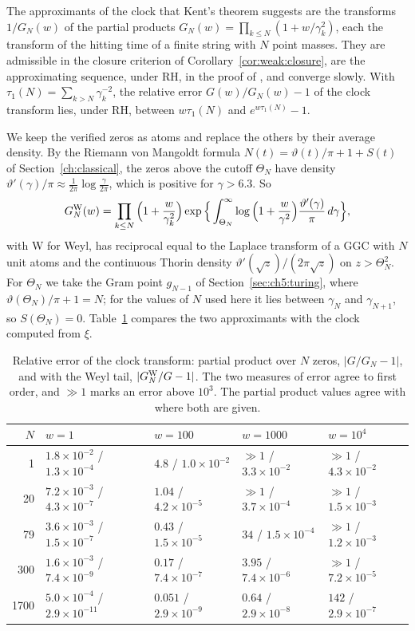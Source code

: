 The approximants of the clock that Kent's theorem suggests are the transforms $1/G_N(w)$ of the partial products $G_N(w)=\prod_{k\le N}(1+w/\gamma_k^2)$, each the transform of the hitting time of a finite string with $N$ point masses. They are admissible in the closure criterion of Corollary~\ref{cor:weak:closure}, are the approximating sequence, under RH, in the proof of \cite[Proposition 18.10]{P26}, and converge slowly. With $\tau_1(N)=\sum_{k>N}\gamma_k^{-2}$, the relative error $G(w)/G_N(w)-1$ of the clock transform lies, under RH, between $w\tau_1(N)$ and $e^{w\tau_1(N)}-1$.

We keep the verified zeros as atoms and replace the others by their average density. By the Riemann von Mangoldt formula $N(t)=\vartheta(t)/\pi+1+S(t)$ of Section~\ref{ch:classical}, the zeros above the cutoff $\Theta_N$ have density $\vartheta'(\gamma)/\pi\approx\frac1{2\pi}\log\frac\gamma{2\pi}$, which is positive for $\gamma>6.3$. So
\[
G_N^{\rm W}(w)=\prod_{k\le N}\Big(1+\frac w{\gamma_k^2}\Big)\exp\Big\{\int_{\Theta_N}^\infty\log\Big(1+\frac w{\gamma^2}\Big)\frac{\vartheta'(\gamma)}\pi\,d\gamma\Big\},
\]
with W for Weyl, has reciprocal equal to the Laplace transform of a GGC with $N$ unit atoms and the continuous Thorin density $\vartheta'(\sqrt z)/(2\pi\sqrt z)$ on $z>\Theta_N^2$. For $\Theta_N$ we take the Gram point $g_{N-1}$ of Section~\ref{sec:ch5:turing}, where $\vartheta(\Theta_N)/\pi+1=N$; for the values of $N$ used here it lies between $\gamma_N$ and $\gamma_{N+1}$, so $S(\Theta_N)=0$. Table~\ref{tab:ch18:kent} compares the two approximants with the clock computed from $\xi$.

\begin{table}[htbp]
\centering\footnotesize
\setlength{\tabcolsep}{4pt}
\begin{tabular}{rllll}
\toprule
$N$ & $w=1$ & $w=100$ & $w=1000$ & $w=10^4$\\
\midrule
1 & $1.8\times10^{-2}$ / $1.3\times10^{-4}$ & $4.8$ / $1.0\times10^{-2}$ & $\gg1$ / $3.3\times10^{-2}$ & $\gg1$ / $4.3\times10^{-2}$\\
20 & $7.2\times10^{-3}$ / $4.3\times10^{-7}$ & $1.04$ / $4.2\times10^{-5}$ & $\gg1$ / $3.7\times10^{-4}$ & $\gg1$ / $1.5\times10^{-3}$\\
79 & $3.6\times10^{-3}$ / $1.5\times10^{-7}$ & $0.43$ / $1.5\times10^{-5}$ & $34$ / $1.5\times10^{-4}$ & $\gg1$ / $1.2\times10^{-3}$\\
300 & $1.6\times10^{-3}$ / $7.4\times10^{-9}$ & $0.17$ / $7.4\times10^{-7}$ & $3.95$ / $7.4\times10^{-6}$ & $\gg1$ / $7.2\times10^{-5}$\\
1700 & $5.0\times10^{-4}$ / $2.9\times10^{-11}$ & $0.051$ / $2.9\times10^{-9}$ & $0.64$ / $2.9\times10^{-8}$ & $142$ / $2.9\times10^{-7}$\\
\bottomrule
\end{tabular}
\caption{Relative error of the clock transform: partial product over $N$ zeros, $|G/G_N-1|$, and with the Weyl tail, $|G_N^{\rm W}/G-1|$. The two measures of error agree to first order, and $\gg1$ marks an error above $10^3$. The partial product values agree with \cite[Section 18.2.1]{P26} where both are given.}
\label{tab:ch18:kent}
\end{table}

